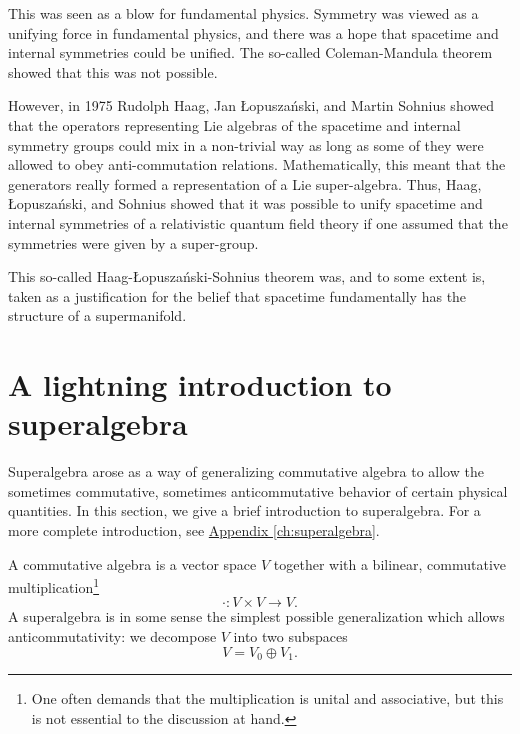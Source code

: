 \documentclass[a4paper,10pt]{scrreprt}
\theoremstyle{definition}
\theoremstyle{plain}
\theoremstyle{remark}
\begin{document}
This was seen as a blow for fundamental physics. Symmetry was viewed as a unifying force in fundamental physics, and there was a hope that spacetime and internal symmetries could be unified. The so-called Coleman-Mandula theorem showed that this was not possible. 

However, in 1975 Rudolph Haag, Jan {\L}opusza{\'n}ski, and Martin Sohnius showed that the operators representing Lie algebras of the spacetime and internal symmetry groups could mix in a non-trivial way as long as some of they were allowed to obey anti-commutation relations. Mathematically, this meant that the generators really formed a representation of a Lie super-algebra. Thus, Haag, {\L}opusza{\'n}ski, and Sohnius showed that it was possible to unify spacetime and internal symmetries of a relativistic quantum field theory if one assumed that the symmetries were given by a super-group.

This so-called Haag-{\L}opusza{\'n}ski-Sohnius theorem was, and to some extent is, taken as a justification for the belief that spacetime fundamentally has the structure of a supermanifold.

\section{A lightning introduction to superalgebra}
Superalgebra arose as a way of generalizing commutative algebra to allow the sometimes commutative, sometimes anticommutative behavior of certain physical quantities. In this section, we give a brief introduction to superalgebra. For a more complete introduction, see \hyperref[ch:superalgebra]{Appendix \ref*{ch:superalgebra}}. 

A commutative algebra is a vector space $V$ together with a bilinear, commutative multiplication\footnote{One often demands that the multiplication is unital and associative, but this is not essential to the discussion at hand.} 
\begin{equation*}
  \cdot\colon V \times V \to V. 
\end{equation*}
A superalgebra is in some sense the simplest possible generalization which allows anticommutativity: we decompose $V$ into two subspaces
\begin{equation*}
  V = V_{0} \oplus V_{1}.
\end{equation*}
\end{document}
